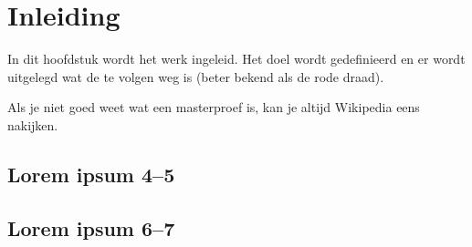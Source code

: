 \chapter{Inleiding}
\label{inleiding}
In dit hoofdstuk wordt het werk ingeleid. Het doel wordt gedefinieerd en er
wordt uitgelegd wat de te volgen weg is (beter bekend als de rode draad).

Als je niet goed weet wat een masterproef is, kan je altijd
Wikipedia\cite{wiki} eens nakijken.

\section{Lorem ipsum 4--5}
\lipsum[4-5]

\section{Lorem ipsum 6--7}
\lipsum[6-7]

